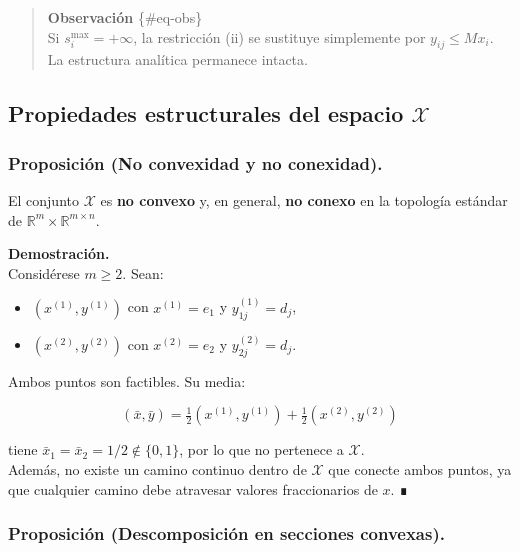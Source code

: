 \documentclass[
  spanish,
  us-letterpaper,
]{scrreprt}
\providecommand{\tightlist}{%
  \setlength{\itemsep}{0pt}\setlength{\parskip}{0pt}}
\numberwithin{equation}{section}
\begin{document}
\begin{quote}
\textbf{Observación} \{\#eq-obs\}\\
Si \(s_i^{\max} = +\infty\), la restricción (ii) se sustituye
simplemente por \(y_{ij} \le M x_i\). La estructura analítica permanece
intacta.
\end{quote}

\subsection{\texorpdfstring{\textbf{Propiedades estructurales del
espacio
\(\mathcal{X}\)}}{Propiedades estructurales del espacio \textbackslash mathcal\{X\}}}\label{propiedades-estructurales-del-espacio-mathcalx}

\subsubsection{\texorpdfstring{\textbf{Proposición (No convexidad y no
conexidad).}}{Proposición (No convexidad y no conexidad).}}\label{proposiciuxf3n-no-convexidad-y-no-conexidad.}

El conjunto \(\mathcal{X}\) es \textbf{no convexo} y, en general,
\textbf{no conexo} en la topología estándar de
\(\mathbb{R}^m \times \mathbb{R}^{m\times n}\).

\textbf{Demostración.}\\
Considérese \(m \ge 2\). Sean:

\begin{itemize}
\tightlist
\item
  \((x^{(1)}, y^{(1)})\) con \(x^{(1)} = e_1\) y \(y^{(1)}_{1j} = d_j\),
\item
  \((x^{(2)}, y^{(2)})\) con \(x^{(2)} = e_2\) y \(y^{(2)}_{2j} = d_j\).
\end{itemize}

Ambos puntos son factibles. Su media:

\[
(\bar{x}, \bar{y}) = \tfrac{1}{2}(x^{(1)}, y^{(1)}) + \tfrac{1}{2}(x^{(2)}, y^{(2)})
\]

tiene \(\bar{x}_1 = \bar{x}_2 = 1/2 \notin \{0,1\}\), por lo que no
pertenece a \(\mathcal{X}\).\\
Además, no existe un camino continuo dentro de \(\mathcal{X}\) que
conecte ambos puntos, ya que cualquier camino debe atravesar valores
fraccionarios de \(x\). ∎

\subsubsection{\texorpdfstring{\textbf{Proposición (Descomposición en
secciones
convexas).}}{Proposición (Descomposición en secciones convexas).}}\label{proposiciuxf3n-descomposiciuxf3n-en-secciones-convexas.}
\end{document}
